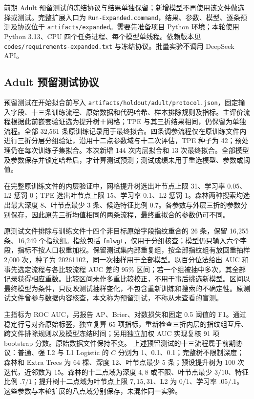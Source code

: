 \documentclass[12pt,journal,onecolumn,a4paper]{IEEEtran}
\newcommand{\code}[1]{\nolinkurl{#1}}
\begin{document}
前期 Adult 预留测试的冻结协议与结果单独保留；新增模型不再使用该文件做选择或测试。完整扩展入口为 \code{Run-Expanded.command}，结果、参数、模型、逐条预测及协议位于 \code{artifacts/expanded}。需要先准备项目 Python 环境；本轮使用 Python 3.13、CPU 四个任务进程、每个模型单线程。依赖版本见 \code{codes/requirements-expanded.txt} 与冻结协议。批量实验不调用 DeepSeek API。
\subsection{Adult 预留测试协议}
预留测试在开始拟合前写入 \code{artifacts/holdout/adult/protocol.json}，固定输入字段、十三条训练流程、原始数据和代码哈希、样本排除规则及指标。主评价流程根据此前嵌套验证选为提升树＋网格；TPE 与其三折结果相同，仍保留为单独流程。全部 32,561 条原训练记录用于最终拟合。四条调参流程仅在原训练文件内进行三折分层分组验证，沿用十二点参数域与十二次评估，TPE 种子为 42；预处理仍在每次训练子集拟合。本次新增 144 次内层拟合和 13 次最终拟合。全部模型及参数保存并锁定哈希后，才计算测试预测；测试成绩未用于重选模型、参数或阈值。

在完整原训练文件的内层验证中，网格提升树选出叶节点上限 31、学习率 0.05、L2 惩罚 0；TPE 选出叶节点上限 15、学习率 0.1、L2 惩罚 1。森林两种搜索均选出最大深度 8、叶节点最少 3 条、候选特征比例 0.7。各参数与外层三折的参数分别保存，因此原先三折均值相同的两条流程，最终重拟合的参数仍可不同。

原测试文件排除与训练文件十四个非目标原始字段指纹重合的 26 条，保留 16,255 条、16,249 个指纹组。指纹包括 \code{fnlwgt}，仅用于分组核查；模型仍只输入六个字段，指标不按人口权重加权。保留测试集内部重复组，按全部指纹组有放回重抽样 2,000 次，种子为 20261102，同一次抽样用于全部模型。以百分位法给出 AUC 和事先选定流程与各比较流程 AUC 差的 95\% 区间；若一个组被抽中多次，其全部记录获得相应重数。比较区间未作多重比较校正，不用于事后挑选新模型。区间以最终模型为条件，只反映测试抽样变化，不包含重新训练和搜索的不确定性。原测试文件曾参与数据内容核查，本文称为预留测试，不称从未查看的盲测。

主指标为 ROC AUC，另报告 AP、Brier、对数损失和固定 0.5 阈值的 F1。通过稳定行号对齐原始标签，独立复算 65 项指标，重新检查三折内层的指纹组互斥、跨文件排除规则以及模型冻结时间；另用独立加权 AUC 实现复核 91 项 bootstrap 分数。原始数据文件保持不变。
上述预留测试的十三流程属于前期协议：普通、强 L2 与 L1 Logistic 的 $C$ 分别为 1、0.1、0.1；完整树不限制深度；森林和 Extra Trees 为 64 棵、深度 12、叶节点最少 5 条；预设提升树为 100 次迭代，近邻数为 15。森林的十二点域为深度 $4,8$ 或不限、叶节点最少 $3/10$、特征比例 $.7/1$；提升树十二点域为叶节点上限 $7,15,31$、L2 为 $0/1$、学习率 $.05/.1$。这些参数与本轮扩展的八点域分别保存，未混作同一实验。

\end{document}

